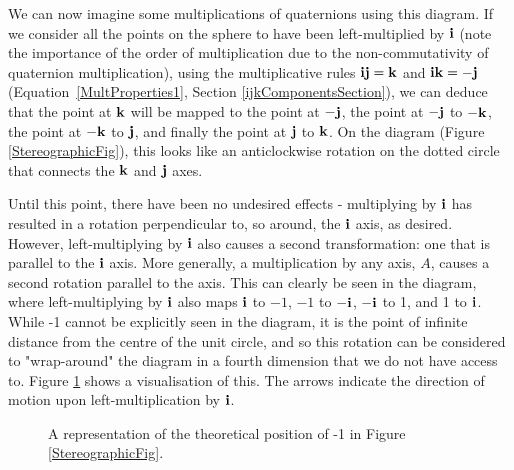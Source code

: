\documentclass[10pt]{article}
\begin{document}
We can now imagine some multiplications of quaternions using this diagram. If we consider all the points on the sphere to have been left-multiplied by $\vb{i}$ (note the importance of the order of multiplication due to the non-commutativity of quaternion multiplication), using the multiplicative rules $\vb{ij} = \vb{k}$ and $\vb{ik} = -\vb{j}$ (Equation \ref{MultProperties1}, Section \ref{ijkComponentsSection}), we can deduce that the point at $\vb{k}$ will be mapped to the point at $-\vb{j}$, the point at $-\vb{j}$ to $-\vb{k}$, the point at $-\vb{k}$ to $\vb{j}$, and finally the point at $\vb{j}$ to $\vb{k}$. On the diagram (Figure \ref{StereographicFig}), this looks like an anticlockwise rotation on the dotted circle that connects the $\vb{k}$ and $\vb{j}$ axes.

Until this point, there have been no undesired effects - multiplying by $\vb{i}$ has resulted in a rotation perpendicular to, so around, the $\vb{i}$ axis, as desired. However, left-multiplying by $\vb{i}$ also causes a second transformation: one that is parallel to the $\vb{i}$ axis. More generally, a multiplication by any axis, $A$, causes a second rotation parallel to the axis. This can clearly be seen in the diagram, where left-multiplying by $\vb{i}$ also maps $\vb{i}$ to $-1$, $-1$ to $-\vb{i}$, $-\vb{i}$ to 1, and 1 to $\vb{i}$. While -1 cannot be explicitly seen in the diagram, it is the point of infinite distance from the centre of the unit circle, and so this rotation can be considered to "wrap-around" the diagram in a fourth dimension that we do not have access to. Figure \ref{LeftMultIFig} shows a visualisation of this. The arrows indicate the direction of motion upon left-multiplication by $\vb{i}$.

\begin{figure}[H]
    \centering
    \caption{A representation of the theoretical position of -1 in Figure \ref{StereographicFig}.}
    \label{LeftMultIFig}
\end{figure}
\end{document}
